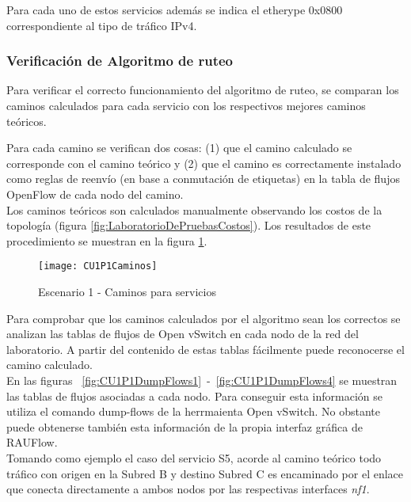 Para cada uno de estos servicios adem\'as se indica el etherype 0x0800 correspondiente al tipo de tr\'afico IPv4.\\

\subsubsection{Verificaci\'on de Algoritmo de ruteo}
Para verificar el correcto funcionamiento del algoritmo de ruteo, se comparan los caminos calculados para cada servicio con los respectivos mejores caminos te\'oricos. 

Para cada camino se verifican dos cosas: (1) que el camino calculado se corresponde con el camino te\'orico y (2) que el camino es correctamente instalado como reglas de reenvío (en base a conmutaci\'on de etiquetas) en la tabla de flujos OpenFlow de cada nodo del camino.\\

Los caminos te\'oricos son calculados manualmente observando los costos de la topolog\'ia (figura \ref{fig:LaboratorioDePruebasCostos}). Los resultados de este procedimiento se muestran en la figura
 \ref{fig:CUP1Caminos}.\\

\begin{figure}[ht!] 
\centering    
\texttt{[image: CU1P1Caminos]}
\caption[Escenario 1 - Caminos para servicios]{Escenario 1 - Caminos para servicios}
\label{fig:CUP1Caminos}
\end{figure}

Para comprobar que los caminos calculados por el algoritmo sean los correctos se analizan las tablas de flujos de Open vSwitch en cada nodo de la red del laboratorio. A partir del contenido de estas tablas fácilmente puede reconocerse el camino calculado.\\

En las figuras ~\ref{fig:CU1P1DumpFlows1}~-~\ref{fig:CU1P1DumpFlows4} se muestran las tablas de flujos asociadas a cada nodo. Para conseguir esta informaci\'on se utiliza el comando dump-flows de la herrmaienta Open vSwitch. No obstante puede obtenerse tambi\'en esta informaci\'on de la propia interfaz gr\'afica de RAUFlow.\\

Tomando como ejemplo el caso del servicio S5, acorde al camino te\'orico todo tr\'afico con origen en la Subred B y destino Subred C es encaminado por el enlace que conecta directamente a ambos nodos por las respectivas interfaces \textit{nf1}. 

